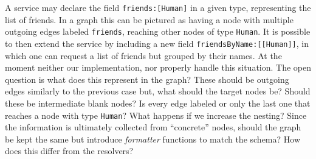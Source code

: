 
A service may declare the field \texttt{friends:[Human]} in a given type, representing the list of friends.
In a graph this can be pictured as having a node with multiple outgoing edges labeled \texttt{friends}, reaching other nodes of type \texttt{Human}. It is possible to then extend the service by including a new field \texttt{friendsByName:[[Human]]}, in which one can request a list of friends but grouped by their names. At the moment neither our implementation, \HP nor \cite{olafschema} properly handle this situation. The open question is what does this represent in the graph? These should be outgoing edges similarly to the previous case but, what should the target nodes be? Should these be intermediate blank nodes? Is every edge labeled or only the last one that reaches a node with type \texttt{Human}? What happens if we increase the nesting? Since the information is ultimately collected from ``concrete'' nodes, should the graph be kept the same but introduce \textit{formatter} functions to match the schema? How does this differ from the \gql resolvers?

